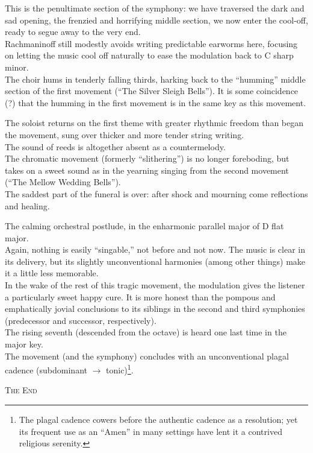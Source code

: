 \documentclass{beamer}
\begin{document}
\begin{frame}
  This is the penultimate section of the symphony: we have traversed the dark and sad opening, the frenzied and horrifying middle section, we now enter the cool-off, ready to segue away to the very end. 
  \pause \\ 
  Rachmaninoff still modestly avoids writing predictable earworms here, focusing on letting the music cool off naturally to ease the modulation back to C sharp minor. 
  \pause \\
  The choir hums in tenderly falling thirds, harking back to the ``humming'' middle section of the first movement (``The Silver Sleigh Bells''). It is some coincidence (?) that the humming in the first movement is in the same key as this movement. 
\end{frame} 

\begin{frame} 
  The soloist returns on the first theme with greater rhythmic freedom than began the movement, sung over thicker and more tender string writing. 
  \pause \\ 
  The sound of reeds is altogether absent as a countermelody. 
  \pause \\ 
  The chromatic movement (formerly ``slithering'') is no longer foreboding, but takes on a sweet sound as in the yearning singing from the second movement (``The Mellow Wedding Bells''). 
  \pause \\ 
  The saddest part of the funeral is over: after shock and mourning come reflections and healing. 
\end{frame} 

\begin{frame}
  The calming orchestral postlude, in the enharmonic parallel major of D flat major. 
  \pause \\
  Again, nothing is easily ``singable,'' not before and not now. The music is clear in its delivery, but its slightly unconventional harmonies (among other things) make it a little less memorable. 
  \pause \\
  In the wake of the rest of this tragic movement, the modulation gives the listener a particularly sweet happy cure. It is more honest than the pompous and emphatically jovial conclusions to its siblings in the second and third symphonies (predecessor and successor, respectively). 
  \pause \\
  The rising seventh (descended from the octave) is heard one last time in the major key. 
  \pause \\ 
  The movement (and the symphony) concludes with an unconventional plagal cadence (subdominant \(\to\) tonic)\footnote{The plagal cadence cowers before the authentic cadence as a resolution; yet its frequent use as an ``Amen'' in many settings have lent it a contrived religious serenity.}. 
\end{frame} 

\begin{frame}
  \begin{center} 
    {\Large\textsc{The End} } 
  \end{center} 
\end{frame} 
\end{document}
